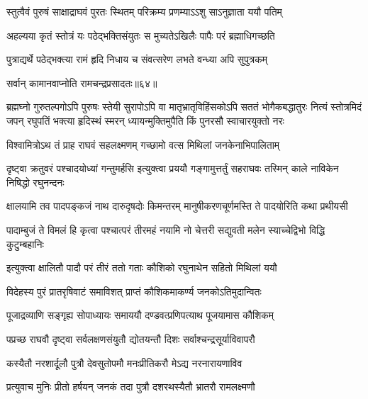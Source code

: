 \twolineshloka
{स्तुत्वैवं पुरुषं साक्षाद्राघवं पुरतः स्थितम्}
{परिक्रम्य प्रणम्याऽऽशु साऽनुज्ञाता ययौ पतिम्} %

\twolineshloka
{अहल्यया कृतं स्तोत्रं यः पठेद्भक्तिसंयुतः}
{स मुच्यतेऽखिलैः पापैः परं ब्रह्माधिगच्छति} %

\twolineshloka
{पुत्राद्यर्थे पठेद्भक्त्या रामं हृदि निधाय च}
{संवत्सरेण लभते वन्ध्या अपि सुपुत्रकम्} %

{सर्वान् कामानवाप्नोति रामचन्द्रप्रसादतः॥६४॥} %


\fourlineindentedshloka
{ब्रह्मघ्नो गुरुतल्पगोऽपि पुरुषः स्तेयी सुरापोऽपि वा}
{मातृभ्रातृविहिंसकोऽपि सततं भोगैकबद्धातुरः}
{नित्यं स्तोत्रमिदं जपन् रघुपतिं भक्त्या हृदिस्थं स्मरन्}
{ध्यायन्मुक्तिमुपैति किं पुनरसौ स्वाचारयुक्तो नरः} %



\twolineshloka
{विश्वामित्रोऽथ तं प्राह राघवं सहलक्ष्मणम्}
{गच्छामो वत्स मिथिलां जनकेनाभिपालिताम्} %

\threelineshloka
{दृष्ट्वा क्रतुवरं पश्चादयोध्यां गन्तुमर्हसि}
{इत्युक्त्वा प्रययौ गङ्गामुत्तर्तुं सहराघवः}
{तस्मिन् काले नाविकेन निषिद्धो रघुनन्दनः} %


\fourlineindentedshloka
{क्षालयामि तव पादपङ्कजं}
{नाथ दारुदृषदोः किमन्तरम्}
{मानुषीकरणचूर्णमस्ति ते}
{पादयोरिति कथा प्रथीयसी} %

\fourlineindentedshloka
{पादाम्बुजं ते विमलं हि कृत्वा}
{पश्चात्परं तीरमहं नयामि}
{नो चेत्तरी सद्युवती मलेन}
{स्याच्चेद्विभो विद्धि कुटुम्बहानिः} %

\twolineshloka
{इत्युक्त्वा क्षालितौ पादौ परं तीरं ततो गताः}
{कौशिको रघुनाथेन सहितो मिथिलां ययौ} %

\twolineshloka
{विदेहस्य पुरं प्रातरृषिवाटं समाविशत्}
{प्राप्तं कौशिकमाकर्ण्य जनकोऽतिमुदान्वितः} %

\twolineshloka
{पूजाद्रव्याणि सङ्गृह्य सोपाध्यायः समाययौ}
{दण्डवत्प्रणिपत्याथ पूजयामास कौशिकम्} %

\twolineshloka
{पप्रच्छ राघवौ दृष्ट्वा सर्वलक्षणसंयुतौ}
{द्योतयन्तौ दिशः सर्वाश्चन्द्रसूर्याविवापरौ} %

\twolineshloka
{कस्यैतौ नरशार्दूलौ पुत्रौ देवसुतोपमौ}
{मनःप्रीतिकरौ मेऽद्य नरनारायणाविव} %

\twolineshloka
{प्रत्युवाच मुनिः प्रीतो हर्षयन् जनकं तदा}
{पुत्रौ दशरथस्यैतौ भ्रातरौ रामलक्ष्मणौ} %

